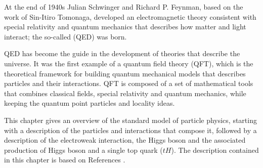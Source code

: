 
At the end of 1940s Julian Schwinger\cite{schwinger} and Richard P. Feynman\cite{feynman}, based on the work of Sin-Itiro Tomonaga\cite{tomonaga}, developed an electromagnetic theory consistent with special relativity and quantum mechanics that describes how matter and light interact; the so-called  (QED) was born.%

QED has become the guide in the development of theories that describe the universe. It was the first example of a quantum field theory (QFT), which is the theoretical framework for building quantum mechanical models that describes particles and their interactions. QFT is composed of a set of mathematical tools that combines classical fields, special relativity and quantum mechanics, while keeping the quantum point particles and locality ideas.

This chapter gives an overview of the standard model of particle physics, starting with a description of the particles and interactions that compose it, followed by a description of the electroweak interaction, the Higgs boson and the associated production of Higgs boson and a single top quark ($tH$). The description contained in this chapter is based on References \cite{griffiths, mandl, halzen}.  %

